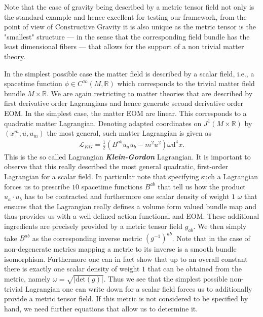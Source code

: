 \documentclass[a4paper,12pt, DIV=14, BCOR=5mm, twoside, headsepline, numbers=noenddot]{scrbook}
\begin{document}
Note that the case of gravity being described by a metric tensor field not only is the standard example and hence excellent for testing our framework, from the point of view of Constructive Gravity it is also unique as the metric tensor is the "smallest" structure --- in the sense that the corresponding field bundle has the least dimensional fibers --- that allows for the support of a non trivial matter theory.

In the simplest possible case the matter field is described by a scalar field, i.e., a spacetime function $\phi \in C^{\infty}(M,\mathbb{R})$ which corresponds to the trivial matter field bundle $M \times \mathbb{R}$. We are again restricting to matter theories that are described by first derivative order Lagrangians and hence generate second derivative order EOM. In the simplest case, the matter EOM are linear. This corresponds to a quadratic matter Lagrangian. Denoting adapted coordinates on $J^1(M \times \mathbb{R})$ by $(x^m,u,u_m)$ the most general, such matter Lagrangian is given as
\begin{align}\label{KGL}
    \mathcal{L}_{KG} = \frac{1}{2} \left ( B^{ab} u_a u_b - m^2 u^2\right )\omega \mathrm{d}^4x.
\end{align}
This is the so called Lagrangian \textit{\textbf{Klein-Gordon}} Lagrangian. It is important to observe that this really described the most general quadratic, first-order Lagrangian for a scalar field. 
In particular note that specifying such a Lagrangian forces us to prescribe $10$ spacetime functions $B^{ab}$ that tell us how the product $u_a\cdot u_b$ has to be contracted and furthermore one scalar density of weight $1$ $\omega$ that ensures that the Lagrangian really defines a volume form valued bundle map and thus provides us with a well-defined action functional and EOM.
These additional ingredients are precisely provided by a metric tensor field $g_{ab}$. We then simply take $B^{ab}$ as the corresponding inverse metric $(g^{-1})^{ab}$. Note that in the case of non-degenerate metrics mapping a metric to its inverse is a smooth bundle isomorphism. Furthermore one can in fact show that up to an overall constant there is exactly one scalar density of weight $1$ that can be obtained from the metric, namely $\omega = \sqrt{ \vert \mathrm{det}(g) \vert }$. 
Thus we see that the simplest possible non-trivial Lagrangian one can write down for a scalar field forces us to additionally provide a metric tensor field. If this metric is not considered to be specified by hand, we need further equations that allow us to determine it.  
\end{document}
